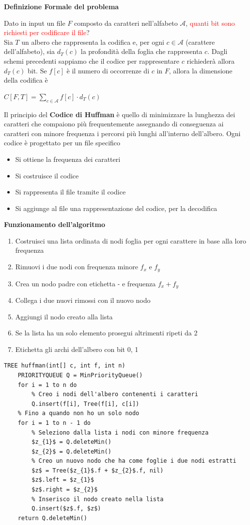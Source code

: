 \documentclass[../cheatSheetAlgoritmi.tex]{subfiles}
\begin{document}
 
\begin{flushleft}
\textbf{Definizione Formale del problema}
\end{flushleft}
Dato in input un file $F$ composto da caratteri nell'alfabeto $\mathcal{A}$, \textcolor{red}{quanti bit sono richiesti per codificare il file}?\\
Sia $T$ un albero che rappresenta la codifica e, per ogni $c \in \mathcal{A}$ (carattere dell'alfabeto), sia $d_{T}(c)$ la profondità della foglia che rappresenta $c$. Dagli schemi precedenti sappiamo che il codice per rappresentare $c$ richiederà allora $d_{T}(c)$ bit. Se $f[c]$ è il numero di occorrenze di $c$ in $F$, allora la dimensione della codifica è
\begin{center}
	$C[F, T] = \sum_{c \in \mathcal{A}} f[c] \cdot d_{T}(c)$
\end{center}
Il principio del \textbf{Codice di Huffman} è quello di minimizzare la lunghezza dei caratteri che compaiono più frequentemente assegnando di conseguenza ai caratteri con minore frequenza i percorsi più lunghi all'interno dell'albero. Ogni codice è progettato per un file specifico
\begin{itemize}
	\item Si ottiene la frequenza dei caratteri
	\item Si costruisce il codice
	\item Si rappresenta il file tramite il codice
	\item Si aggiunge al file una rappresentazione del codice, per la decodifica
\end{itemize}
\textbf{Funzionamento dell'algoritmo}
\begin{enumerate}
	\item Costruisci una lista ordinata di nodi foglia per ogni carattere in base alla loro frequenza
	\item Rimuovi i due nodi con frequenza minore $f_{x}$ e $f_{y}$
	\item Crea un nodo padre con etichetta - e frequenza $f_{x} + f_{y}$
	\item Collega i due nuovi rimossi con il nuovo nodo
	\item Aggiungi il nodo creato alla lista 
	\item Se la lista ha un solo elemento prosegui altrimenti ripeti da 2
	\item Etichetta gli archi dell'albero con bit 0, 1
\end{enumerate}
\begin{lstlisting}[caption=creazione albero binario di decodifica]
TREE huffman(int[] c, int f, int n)
	PRIORITYQUEUE Q = MinPriorityQueue()
	for i = 1 to n do
		% Creo i nodi dell'albero contenenti i caratteri
		Q.insert(f[i], Tree(f[i], c[i])
	% Fino a quando non ho un solo nodo
	for i = 1 to n - 1 do
		% Seleziono dalla lista i nodi con minore frequenza
		$z_{1}$ = Q.deleteMin()
		$z_{2}$ = Q.deleteMin()
		% Creo un nuovo nodo che ha come foglie i due nodi estratti
		$z$ = Tree($z_{1}$.f + $z_{2}$.f, nil)
		$z$.left = $z_{1}$
		$z$.right = $z_{2}$
		% Inserisco il nodo creato nella lista
		Q.insert($z$.f, $z$)
	return Q.deleteMin()
\end{lstlisting}
\end{document}
